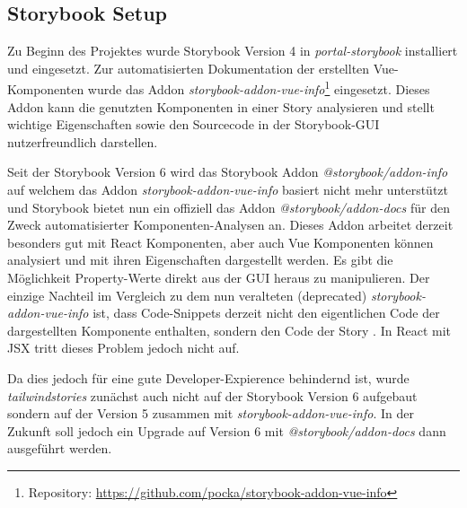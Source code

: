 \subsection{Storybook Setup}
\label{sec:storybooksetup}
Zu Beginn des Projektes wurde Storybook Version 4 in \textit{portal-storybook} installiert und eingesetzt. Zur automatisierten Dokumentation der erstellten Vue-Komponenten wurde das Addon \textit{storybook-addon-vue-info}\footnote{Repository: \url{https://github.com/pocka/storybook-addon-vue-info}} eingesetzt. Dieses Addon kann die genutzten Komponenten in einer Story analysieren und stellt wichtige Eigenschaften sowie den Sourcecode in der Storybook-GUI nutzerfreundlich darstellen.

Seit der Storybook Version 6 wird das Storybook Addon \textit{@storybook/addon-info} auf welchem das Addon \textit{storybook-addon-vue-info} basiert nicht mehr unterstützt und Storybook bietet nun ein offiziell das Addon \textit{@storybook/addon-docs} für den Zweck automatisierter Komponenten-Analysen an. Dieses Addon arbeitet derzeit besonders gut mit React Komponenten, aber auch Vue Komponenten können analysiert und mit ihren Eigenschaften dargestellt werden. Es gibt die Möglichkeit Property-Werte direkt aus der GUI heraus zu manipulieren. Der einzige Nachteil im Vergleich zu dem nun veralteten (deprecated) \textit{storybook-addon-vue-info} ist, dass Code-Snippets derzeit nicht den eigentlichen Code der dargestellten Komponente enthalten, sondern den Code der Story \citep{GithubIssueStorybook}. In React mit JSX tritt dieses Problem jedoch nicht auf.

Da dies jedoch für eine gute Developer-Expierence behindernd ist, wurde \textit{tailwindstories} zunächst auch nicht auf der Storybook Version 6 aufgebaut sondern auf der Version 5 zusammen mit \textit{storybook-addon-vue-info}. In der Zukunft soll jedoch ein Upgrade auf Version 6 mit \textit{@storybook/addon-docs} dann ausgeführt werden.


